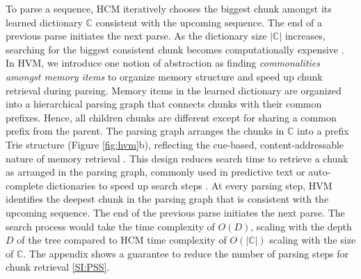 \documentclass{article} %
\theoremstyle{remark}
\begin{document}

To parse a sequence, HCM iteratively chooses the biggest chunk amongst its learned dictionary $\mathbb{C}$ consistent with the upcoming sequence. The end of a previous parse initiates the next parse. As the dictionary size $|\mathbb{C}|$ increases, searching for the biggest consistent chunk becomes computationally expensive \citep{schreiber2023biologicallyplausible}. 
In HVM, we introduce one notion of abstraction as finding \textit{commonalities amongst memory items} to organize memory structure and speed up chunk retrieval during parsing. Memory items in the learned dictionary are organized into a hierarchical parsing graph that connects chunks with their common prefixes. Hence, all children chunks are different except for sharing a common prefix from the parent. The parsing graph arranges the chunks in $\mathbb{C}$ into a prefix Trie structure (Figure \ref{fig:hvm}b), reflecting the cue-based, content-addressable nature of memory retrieval \citep{Cunnings2018,dotlacil_parsing_2021, Anderson1974}. This design reduces search time to retrieve a chunk as arranged in the parsing graph, commonly used in predictive text or auto-complete dictionaries to speed up search steps \citep{Fredkin60}.
At every parsing step, HVM identifies the deepest chunk in the parsing graph that is consistent with the upcoming sequence. The end of the previous parse initiates the next parse. The search process would take the time complexity of $O(D)$, scaling with the depth $D$ of the tree compared to HCM time complexity of $O(|\mathbb{C}|)$ scaling with the size of $\mathbb{C}$. The appendix shows a guarantee to reduce the number of parsing steps for chunk retrieval \ref{SI:PSS}. 
\end{document}
